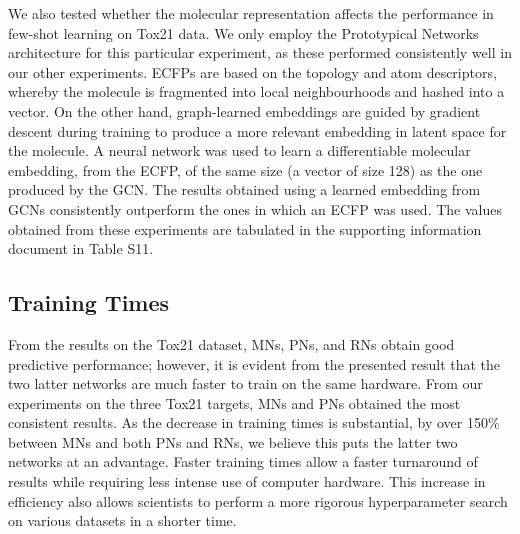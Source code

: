We also tested whether the molecular representation affects the performance in few-shot learning on Tox21 data. We only employ the Prototypical Networks architecture for this particular experiment, as these performed consistently well in our other experiments. ECFPs are based on the topology and atom descriptors, whereby the molecule is fragmented into local neighbourhoods and hashed into a vector. On the other hand, graph-learned embeddings are guided by gradient descent during training to produce a more relevant embedding in latent space for the molecule. A neural network was used to learn a differentiable molecular embedding, from the ECFP, of the same size (a vector of size 128) as the one produced by the GCN. The results obtained using a learned embedding from GCNs consistently outperform the ones in which an ECFP was used. The values obtained from these experiments are tabulated in the supporting information document in Table S11.

\subsection{Training Times}

From the results on the Tox21 dataset, MNs, PNs, and RNs obtain good predictive performance; however, it is evident from the presented result that the two latter networks are much faster to train on the same hardware. From our experiments on the three Tox21 targets, MNs and PNs obtained the most consistent results. As the decrease in training times is substantial, by over 150\% between MNs and both PNs and RNs, we believe this puts the latter two networks at an advantage. Faster training times allow a faster turnaround of results while requiring less intense use of computer hardware. This increase in efficiency also allows scientists to perform a more rigorous hyperparameter search on various datasets in a shorter time.
